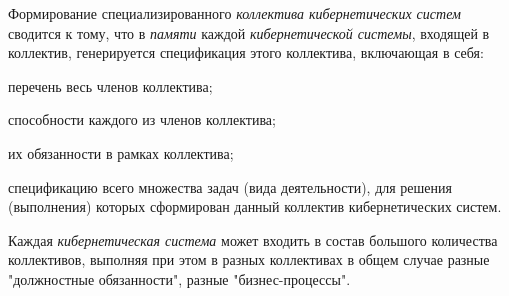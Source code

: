 Формирование специализированного \textit{коллектива кибернетических систем} сводится к тому, что в \textit{памяти} каждой \textit{кибернетической системы}, входящей в коллектив, генерируется спецификация этого коллектива, включающая в себя:
\begin{textitemize}
    \item перечень весь членов коллектива;
    \item способности каждого из членов коллектива;
    \item их обязанности в рамках коллектива;
    \item спецификацию всего множества задач (вида деятельности), для решения (выполнения) которых сформирован данный коллектив кибернетических систем.
\end{textitemize}

Каждая \textit{кибернетическая система} может входить в состав большого количества коллективов, выполняя при этом в разных коллективах в общем случае разные "должностные обязанности"{}, разные "бизнес-процессы"{}.
